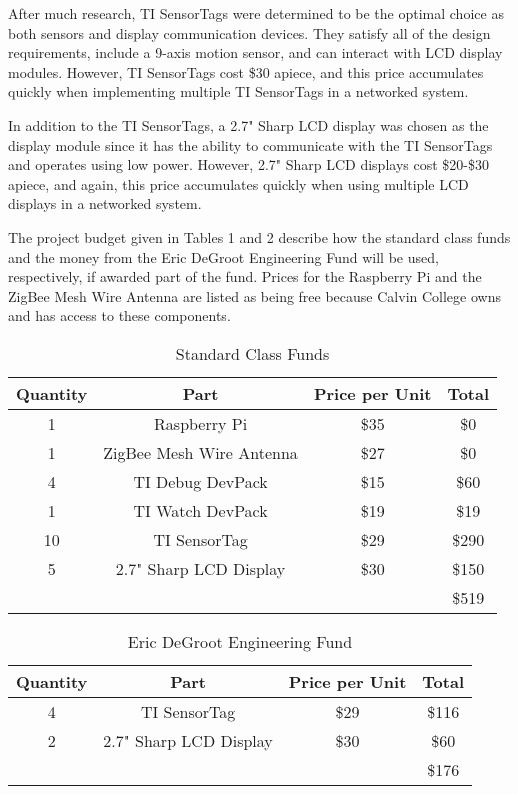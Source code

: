 \documentclass[11pt, oneside]{article}   	%
\begin{document}
After much research, TI SensorTags were determined to be the optimal choice as both sensors and display communication devices. They satisfy all of the design requirements, include a 9-axis motion sensor, and can interact with LCD display modules. However, TI SensorTags cost \$30 apiece, and this price accumulates quickly when implementing multiple TI SensorTags in a networked system.

In addition to the TI SensorTags, a 2.7" Sharp LCD display was chosen as the display module since it has the ability to communicate with the TI SensorTags and operates using low power. However, 2.7" Sharp LCD displays cost \$20-\$30 apiece, and again, this price accumulates quickly when using multiple LCD displays in a networked system.

The project budget given in Tables 1 and 2 describe how the standard class funds and the money from the Eric DeGroot Engineering Fund will be used, respectively, if awarded part of the fund. Prices for the Raspberry Pi and the ZigBee Mesh Wire Antenna are listed as being free because Calvin College owns and has access to these components.

\begin{table}[h!]
  \begin{center}
    \caption{Standard Class Funds}
    \label{tab:table1}
    \begin{tabular}{|c|c|c|c|}
      \hline
      Quantity & Part & Price per Unit & Total\\
      \hline
      1 & Raspberry Pi & \$35 & \$0\\
      \hline
      1 & ZigBee Mesh Wire Antenna & \$27 & \$0\\
      \hline
      4 & TI Debug DevPack & \$15 & \$60\\
      \hline
      1 & TI Watch DevPack & \$19 & \$19\\
      \hline
      10 & TI SensorTag & \$29 & \$290\\
      \hline
      5 & 2.7" Sharp LCD Display & \$30 & \$150\\
      \hline
      &&& \$519\\
      \hline
    \end{tabular}
  \end{center}
\end{table}

\begin{table}[h!]
  \begin{center}
    \caption{Eric DeGroot Engineering Fund}
    \label{tab:table2}
    \begin{tabular}{|c|c|c|c|}
      \hline
      Quantity & Part & Price per Unit & Total\\
      \hline
      4 & TI SensorTag & \$29 & \$116\\
      \hline
      2 & 2.7" Sharp LCD Display & \$30 & \$60\\
      \hline
      &&& \$176\\
      \hline
    \end{tabular}
  \end{center}
\end{table}
\end{document}
